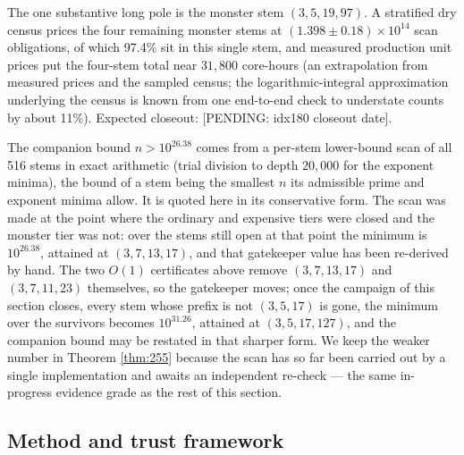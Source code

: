 \documentclass[11pt]{article}
\theoremstyle{remark}
\begin{document}
The one substantive long pole is the monster stem $(3,5,19,97)$. A stratified dry census prices the four remaining monster stems at $(1.398 \pm 0.18) \times 10^{14}$ scan obligations, of which 97.4\% sit in this single stem, and measured production unit prices put the four-stem total near $31{,}800$ core-hours (an extrapolation from measured prices and the sampled census; the logarithmic-integral approximation underlying the census is known from one end-to-end check to understate counts by about 11\%). Expected closeout: [PENDING: idx180 closeout date].

The companion bound $n > 10^{26.38}$ comes from a per-stem lower-bound scan of all 516 stems in exact arithmetic (trial division to depth $20{,}000$ for the exponent minima), the bound of a stem being the smallest $n$ its admissible prime and exponent minima allow. It is quoted here in its conservative form. The scan was made at the point where the ordinary and expensive tiers were closed and the monster tier was not: over the stems still open at that point the minimum is $10^{26.38}$, attained at $(3,7,13,17)$, and that gatekeeper value has been re-derived by hand. The two $O(1)$ certificates above remove $(3,7,13,17)$ and $(3,7,11,23)$ themselves, so the gatekeeper moves; once the campaign of this section closes, every stem whose prefix is not $(3,5,17)$ is gone, the minimum over the survivors becomes $10^{31.26}$, attained at $(3,5,17,127)$, and the companion bound may be restated in that sharper form. We keep the weaker number in Theorem \ref{thm:255} because the scan has so far been carried out by a single implementation and awaits an independent re-check --- the same in-progress evidence grade as the rest of this section.

\subsection{Method and trust framework}\label{sec:255method}
\end{document}
